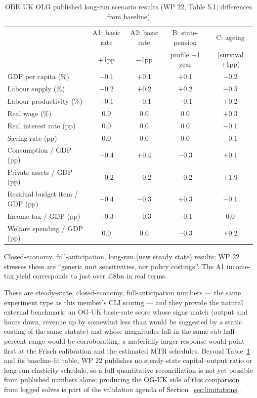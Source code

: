 \begin{table}[t]
\centering
\caption{OBR UK OLG published long-run scenario results (WP 22, Table 5.1; differences from baseline)}
\label{tab:obrscenarios}
\footnotesize
\begin{tabular}{lcccc}
\toprule
 & A1: basic rate & A2: basic rate & B: state-pension & C: ageing \\
 & +1pp & $-$1pp & profile +1 year & (survival +1pp) \\
\midrule
GDP per capita (\%) & $-$0.1 & $+$0.1 & $+$0.1 & $-$0.2 \\
Labour supply (\%) & $-$0.2 & $+$0.2 & $+$0.2 & $-$0.5 \\
Labour productivity (\%) & $+$0.1 & $-$0.1 & $-$0.1 & $+$0.2 \\
Real wage (\%) & 0.0 & 0.0 & 0.0 & $+$0.3 \\
Real interest rate (pp) & 0.0 & 0.0 & 0.0 & $-$0.1 \\
Saving rate (pp) & 0.0 & 0.0 & 0.0 & $-$0.1 \\
Consumption / GDP (pp) & $-$0.4 & $+$0.4 & $-$0.3 & $+$0.1 \\
Private assets / GDP (pp) & $-$0.2 & $-$0.2 & $-$0.2 & $+$1.9 \\
Residual budget item / GDP (pp) & $+$0.4 & $-$0.3 & $+$0.3 & $-$0.1 \\
Income tax / GDP (pp) & $+$0.3 & $-$0.3 & $-$0.1 & 0.0 \\
Welfare spending / GDP (pp) & 0.0 & 0.0 & $-$0.3 & $+$0.2 \\
\bottomrule
\end{tabular}
\begin{minipage}{0.88\textwidth}
\vspace{2pt}\footnotesize Closed-economy, full-anticipation, long-run (new steady state) results; WP 22 stresses these are ``generic unit sensitivities, not policy costings''. The A1 income-tax yield corresponds to just over \pounds 8bn in real terms.
\end{minipage}
\end{table}

These are steady-state, closed-economy, full-anticipation numbers --- the same experiment type as this member's CLI scoring --- and they provide the natural external benchmark: an OG-UK basic-rate score whose signs match (output and hours down, revenue up by somewhat less than would be suggested by a static costing of the same statute) and whose magnitudes fall in the same sub-half-percent range would be corroborating; a materially larger response would point first at the Frisch calibration and the estimated MTR schedules. Beyond Table~\ref{tab:obrscenarios} and its baseline-fit table, WP 22 publishes no steady-state capital--output ratio or long-run elasticity schedule, so a full quantitative reconciliation is not yet possible from published numbers alone; producing the OG-UK side of this comparison from logged solves is part of the validation agenda of Section~\ref{sec:limitations}.

